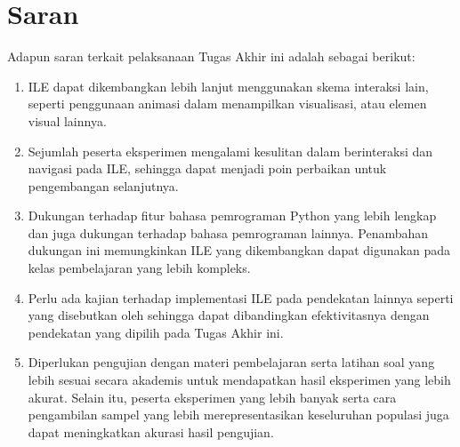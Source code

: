 \begin{enumerate}
\end{enumerate}

\section{Saran}
Adapun saran terkait pelaksanaan Tugas Akhir ini adalah sebagai berikut:
\begin{enumerate}
  \item ILE dapat dikembangkan lebih lanjut menggunakan skema interaksi lain, seperti penggunaan animasi dalam menampilkan visualisasi, atau elemen visual lainnya.
  \item Sejumlah peserta eksperimen mengalami kesulitan dalam berinteraksi dan navigasi pada ILE, sehingga dapat menjadi poin perbaikan untuk pengembangan selanjutnya.
  \item Dukungan terhadap fitur bahasa pemrograman Python yang lebih lengkap dan juga dukungan terhadap bahasa pemrograman lainnya. Penambahan dukungan ini memungkinkan ILE yang dikembangkan dapat digunakan pada kelas pembelajaran yang lebih kompleks.
  \item Perlu ada kajian terhadap implementasi ILE pada pendekatan lainnya seperti yang disebutkan oleh \textcite{moons2013pilot} sehingga dapat dibandingkan efektivitasnya dengan pendekatan yang dipilih pada Tugas Akhir ini.
  \item Diperlukan pengujian dengan materi pembelajaran serta latihan soal yang lebih sesuai secara akademis untuk mendapatkan hasil eksperimen yang lebih akurat. Selain itu, peserta eksperimen yang lebih banyak serta cara pengambilan sampel yang lebih merepresentasikan keseluruhan populasi juga dapat meningkatkan akurasi hasil pengujian.
\end{enumerate}